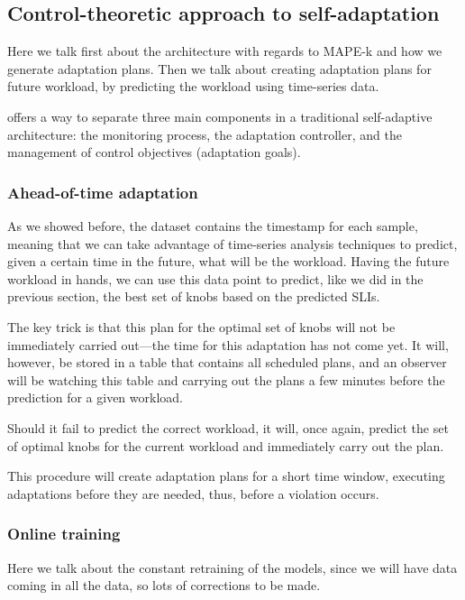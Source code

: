 \subsection{Control-theoretic approach to self-adaptation}

Here we talk first about the architecture with regards to MAPE-k and how we generate adaptation plans. Then we talk about creating adaptation plans for future workload, by predicting the workload using time-series data.

\projectname{} offers a way to separate three main components in a traditional self-adaptive architecture: the monitoring process, the adaptation controller, and the management of control objectives (adaptation goals).

\subsubsection{Ahead-of-time adaptation}

As we showed before, the dataset contains the timestamp for each sample, meaning that we can take advantage of time-series analysis techniques to predict, given a certain time in the future, what will be the workload. Having the future workload in hands, we can use this data point to predict, like we did in the previous section, the best set of knobs based on the predicted SLIs.

The key trick is that this plan for the optimal set of knobs will not be immediately carried out---the time for this adaptation has not come yet. It will, however, be stored in a table that contains all scheduled plans, and an observer will be watching this table and carrying out the plans a few minutes before the prediction for a given workload.

Should it fail to predict the correct workload, it will, once again, predict the set of optimal knobs for the current workload and immediately carry out the plan.

This procedure will create adaptation plans for a short time window, executing adaptations before they are needed, thus, before a violation occurs.


\subsubsection{Online training}

Here we talk about the constant retraining of the models, since we will have data coming in all the data, so lots of corrections to be made.

